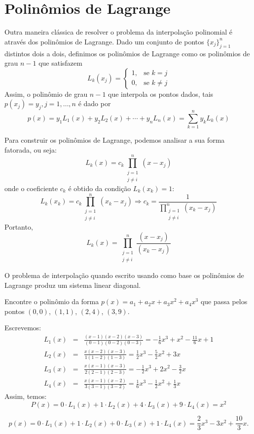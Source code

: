 \section{Polinômios de Lagrange}
Outra maneira clássica de resolver o problema da interpolação polinomial é através dos polinômios de Lagrange. Dado um conjunto de pontos $\{x_j\}_{j=1}^n$ distintos dois a dois, definimos os polinômios de Lagrange como os polinômios de grau $n-1$ que satisfazem
$$
L_k(x_j)=\left\{\begin{array}{rl}
1,& \text{se }k=j\\
0,& \text{se }k\neq j
\end{array}
\right.
$$
Assim, o polinômio de grau $n-1$ que interpola os pontos dados, tais $p(x_j)=y_j, j=1,\ldots,n$ é dado por
$$p(x)=y_1L_1(x)+y_2L_2(x)+\cdots +y_nL_n(x)=\sum_{k=1}^n y_k L_k(x)$$

Para construir os polinômios de Lagrange, podemos analisar a sua forma fatorada, ou seja:
$$L_k(x)=c_k\prod_{\substack{j=1\\j\ne i}}^{n} (x-x_j)$$
onde o coeficiente $c_k$ é obtido da condição $L_k(x_k)=1$:
$$L_k(x_k)=c_k\prod_{\substack{j=1\\j\ne i}}^{n} (x_k-x_j) \Longrightarrow  c_k=\frac{1}{\displaystyle \prod_{\substack{j=1\\j\ne i}}^{n} (x_k-x_j)}$$
Portanto,
$$L_k(x)=\prod_{\substack{j=1\\j\ne i}}^{n} \frac{(x-x_j)}{(x_k-x_j)}$$

\begin{obs} O problema de interpolação quando escrito usando como base os polinômios de Lagrange produz um sistema linear diagonal.
\end{obs}

\begin{ex}
  Encontre o polinômio da forma $p(x)=a_1+a_2x+a_3x^2+a_4x^3$ que passa pelos pontos $(0, 0)$, $(1, 1)$, $(2, 4)$, $(3, 9)$.
\end{ex}
\begin{sol}
Escrevemos:
\begin{eqnarray*}
	L_1(x)&=& \frac{(x-1)(x-2)(x-3)}{(0-1)(0-2)(0-3)}=-\frac{1}{6}x^3+x^2-\frac{11}{6}x+1\\
	L_2(x)&=& \frac{x(x-2)(x-3)}{1(1-2)(1-3)}=\frac{1}{2}x^3-\frac{5}{2}x^2+3x\\
	L_3(x)&=& \frac{x(x-1)(x-3)}{2(2-1)(2-3)}=-\frac{1}{2}x^3+2x^2-\frac{3}{2}x\\
	L_4(x)&=& \frac{x(x-1)(x-2)}{3(3-1)(3-2)}=\frac{1}{6}x^3-\frac{1}{2}x^2+\frac{1}{3}x
\end{eqnarray*}
Assim, temos:
\begin{equation*}
  P(x)=0\cdot L_1(x)+1\cdot L_2(x)+4\cdot L_3(x)+9\cdot L_4(x)=x^2
\end{equation*}

\begin{equation*}
  p(x)=0\cdot L_1(x)+1\cdot L_2(x)+0\cdot L_3(x)+1\cdot L_4(x)=\frac{2}{3}x^3-3x^2+\frac{10}{3}x.
\end{equation*}
\end{sol}

